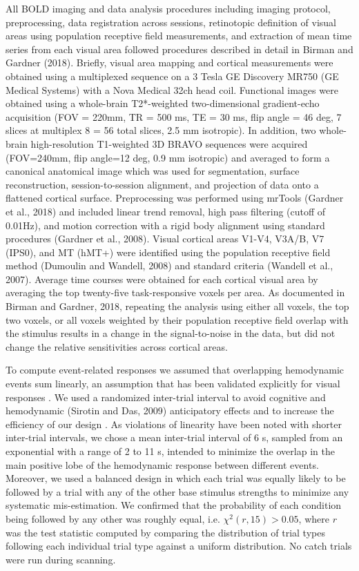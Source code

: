 \documentclass{report}
\begin{document}
All BOLD imaging and data analysis procedures including imaging protocol, preprocessing, data registration across sessions, retinotopic definition of visual areas using population receptive field measurements, and extraction of mean time series from each visual area followed procedures described in detail in Birman and Gardner (2018). Briefly, visual area mapping and cortical measurements were obtained using a multiplexed sequence on a 3 Tesla GE Discovery MR750 (GE Medical Systems) with a Nova Medical 32ch head coil. Functional images were obtained using a whole-brain T2*-weighted two-dimensional gradient-echo acquisition (FOV = 220mm, TR = 500 ms, TE = 30 ms, flip angle = 46 deg, 7 slices at multiplex 8 = 56 total slices, 2.5 mm isotropic). In addition, two whole-brain high-resolution T1-weighted 3D BRAVO sequences were acquired (FOV=240mm, flip angle=12 deg, 0.9 mm isotropic) and averaged to form a canonical anatomical image which was used for segmentation, surface reconstruction, session-to-session alignment, and projection of data onto a flattened cortical surface. Preprocessing was performed using mrTools (Gardner et al., 2018) and included linear trend removal, high pass filtering (cutoff of 0.01Hz), and motion correction with a rigid body alignment using standard procedures (Gardner et al., 2008). Visual cortical areas V1-V4, V3A/B, V7 (IPS0), and MT (hMT+) were identified using the population receptive field method (Dumoulin and Wandell, 2008) and standard criteria (Wandell et al., 2007). Average time courses were obtained for each cortical visual area by averaging the top twenty-five task-responsive voxels per area. As documented in Birman and Gardner, 2018, repeating the analysis using either all voxels, the top two voxels, or all voxels weighted by their population receptive field overlap with the stimulus results in a change in the signal-to-noise in the data, but did not change the relative sensitivities across cortical areas. 

To compute event-related responses we assumed that overlapping hemodynamic events sum linearly, an assumption that has been validated explicitly for visual responses \citep{Boynton1996-ff,Dale1997-ur}. We used a randomized inter-trial interval to avoid cognitive \citep{Zarahn1997-jc} and hemodynamic (Sirotin and Das, 2009) anticipatory effects and to increase the efficiency of our design \citep{Dale1999-oq,Liu2004-qy}. As violations of linearity have been noted with shorter inter-trial intervals, we chose a mean inter-trial interval of 6 s, sampled from an exponential with a range of 2 to 11 s, intended to minimize the overlap in the main positive lobe of the hemodynamic response between different events. Moreover, we used a balanced design in which each trial was equally likely to be followed by a trial with any of the other base stimulus strengths to minimize any systematic mis-estimation. We confirmed that the probability of each condition being followed by any other was roughly equal, i.e. $\chi^2(r,15)>0.05$, where $r$ was the test statistic computed by comparing the distribution of trial types following each individual trial type against a uniform distribution. No catch trials were run during scanning.
\end{document}

